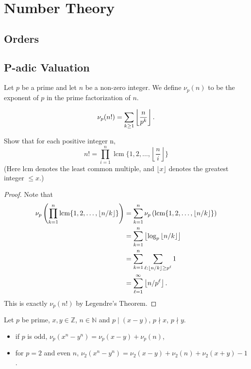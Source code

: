 \documentclass[11pt]{article}
\newcommand{\N}{\mathbb{N}}
\newcommand{\Z}{\mathbb{Z}}
\renewcommand{\>}{\rangle}
\newcommand{\<}{\langle}
\begin{document}
\section{Number Theory}
\subsection{Orders}
\subsection{P-adic Valuation}
\begin{definition} Let $p$ be a prime and let $n$ be a non-zero integer.  We define $\nu_p(n)$ to be the exponent of $p$ in the prime factorization of $n$.
\end{definition}
\begin{theorem} 
$$\nu_p(n!) = \sum_{k \ge 1} \left\lfloor \frac{n}{p^k} \right\rfloor.$$
\end{theorem}

\begin{problem}[Putnam 2003/B3]
Show that for each positive integer n,\[n!=\prod_{i=1}^n \; \text{lcm} \; \{1, 2, \ldots, \left\lfloor\frac{n}{i} \right\rfloor\}\](Here lcm denotes the least common multiple, and $\lfloor x\rfloor$ denotes the greatest integer $\le x$.)
\end{problem}
\begin{proof}
 Note that 
\begin{align*}
\nu_p\left ( \prod_{k=1}^n \operatorname*{lcm} \{1, 2, \dots, \left\lfloor n/k \right\rfloor\}\right) &= \sum_{k=1}^n \nu_p \left (\operatorname*{lcm}\{1, 2, \dots, \left\lfloor n/k \right\rfloor\} \right) \\
&= \sum_{k=1}^n \left\lfloor \log_p \left\lfloor n/k \right\rfloor \right\rfloor \\
&= \sum_{k=1}^n \sum_{\ell : \left\lfloor n/k \right\rfloor \ge p^\ell} 1 \\
&= \sum_{\ell=1}^\infty \left\lfloor n/p^\ell \right\rfloor.
\end{align*}
This is exactly $\nu_p(n!)$ by Legendre's Theorem.  
\end{proof}
\begin{theorem} 
Let $p$ be prime, $x, y \in \Z$, $n \in \N$ and $p \mid(x-y)$, $p \nmid x$, $p \nmid y$. 
\begin{itemize}
\item if $p$ is odd, $\nu_p(x^n - y^n) = \nu_p(x-y) + \nu_p(n)$,
\item for $p = 2$ and even $n$, $\nu_2(x^n - y^n) = \nu_2(x-y) + \nu_2(n) + \nu_2(x + y) - 1$.
\end{itemize}
\end{theorem}
\end{document}

